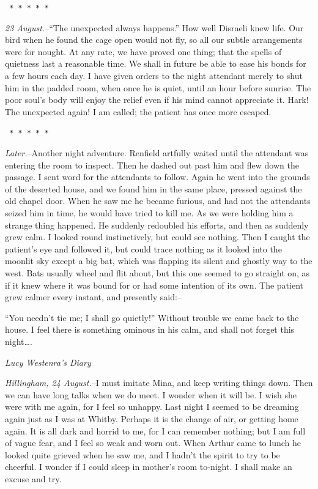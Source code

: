 \documentclass[12pt,openright]{book}
\begin{document}
\texttt{   *       *       *       *       *}

\textit{23 August.}–“The unexpected always happens.” How well Disraeli knew life. Our bird when he found the cage open would not fly, so all our subtle arrangements were for nought. At any rate, we have proved one thing; that the spells of quietness last a reasonable time. We shall in future be able to ease his bonds for a few hours each day. I have given orders to the night attendant merely to shut him in the padded room, when once he is quiet, until an hour before sunrise. The poor soul’s body will enjoy the relief even if his mind cannot appreciate it. Hark! The unexpected again! I am called; the patient has once more escaped.

\texttt{   *       *       *       *       *}

\textit{Later.}–Another night adventure. Renfield artfully waited until the attendant was entering the room to inspect. Then he dashed out past him and flew down the passage. I sent word for the attendants to follow. Again he went into the grounds of the deserted house, and we found him in the same place, pressed against the old chapel door. When he saw me he became furious, and had not the attendants seized him in time, he would have tried to kill me. As we were holding him a strange thing happened. He suddenly redoubled his efforts, and then as suddenly grew calm. I looked round instinctively, but could see nothing. Then I caught the patient’s eye and followed it, but could trace nothing as it looked into the moonlit sky except a big bat, which was flapping its silent and ghostly way to the west. Bats usually wheel and flit about, but this one seemed to go straight on, as if it knew where it was bound for or had some intention of its own. The patient grew calmer every instant, and presently said:–

“You needn’t tie me; I shall go quietly!” Without trouble we came back to the house. I feel there is something ominous in his calm, and shall not forget this night….

\textit{Lucy Westenra’s Diary}

\textit{Hillingham, 24 August.}–I must imitate Mina, and keep writing things down. Then we can have long talks when we do meet. I wonder when it will be. I wish she were with me again, for I feel so unhappy. Last night I seemed to be dreaming again just as I was at Whitby. Perhaps it is the change of air, or getting home again. It is all dark and horrid to me, for I can remember nothing; but I am full of vague fear, and I feel so weak and worn out. When Arthur came to lunch he looked quite grieved when he saw me, and I hadn’t the spirit to try to be cheerful. I wonder if I could sleep in mother’s room to-night. I shall make an excuse and try.
\end{document}
